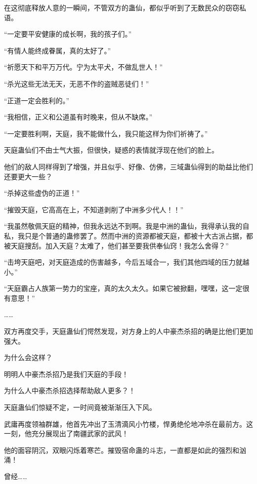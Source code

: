 
\begin{this_body}

在这彻底释放人意的一瞬间，不管双方的蛊仙，都似乎听到了无数民众的窃窃私语。

“一定要平安健康的成长啊，我的孩子们。”

“有情人能终成眷属，真的太好了。”

“祈愿天下和平万万代。宁为太平犬，不做乱世人！”

“杀光这些无法无天，无恶不作的盗贼恶徒们！”

“正道一定会胜利的。”

“我相信，正义和公道虽有时晚来，但从不缺席。”

“一定要胜利啊，天庭，我不能做什么，我只能这样为你们祈祷了。”

天庭蛊仙们不由士气大振，但很快，疑惑的表情就浮现在他们的脸上。

他们的敌人同样得到了增强，并且似乎、好像、仿佛，三域蛊仙得到的助益比他们还要更大一些？

“杀掉这些虚伪的正道！”

“摧毁天庭，它高高在上，不知道剥削了中洲多少代人！！”

“我虽然敬佩天庭的精神，但我永远达不到啊。我是中洲的蛊仙，我得承认我的自私，我只是个普通的蛊修罢了。然而中洲的资源都被天庭，都被十大古派占据，都被天庭搜刮。加入天庭？太难了，他们甚至要我供奉仙窍！我怎么舍得？”

“击垮天庭吧，对天庭造成的伤害越多，今后五域合一，我们其他四域的压力就越小。”

“天庭霸占人族第一势力的宝座，真的太久太久。如果它被掀翻，嘿嘿，这一定很有意思！”

……

双方再度交手，天庭蛊仙们愕然发现，对方身上的人中豪杰杀招的确是比他们更加强大。

为什么会这样？

明明人中豪杰杀招乃是我们天庭的手段！

为什么人中豪杰杀招选择帮助敌人更多？！

天庭蛊仙们惊疑不定，一时间竟被渐渐压入下风。

武庸再度领袖群雄，他首先冲出了玉清滴风小竹楼，悍勇绝伦地冲杀在最前方。这一刻，他充分展现出了南疆武家的武风！

他的面容阴沉，双眼闪烁着寒芒。摧毁宿命蛊的斗志，一直都是如此的强烈和汹涌！

曾经……


\end{this_body}
